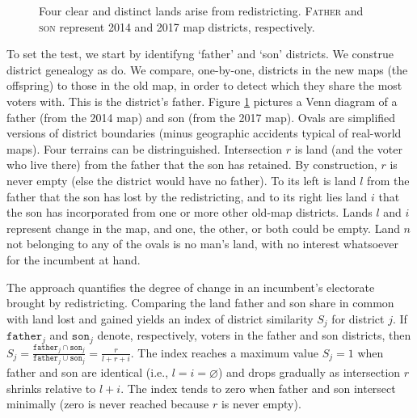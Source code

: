 \documentclass[letter,12pt]{article}
\begin{document}
\begin{figure}
  \centering
    \usetikzlibrary{calc}
    \caption{Four clear and distinct lands arise from redistricting. \textsc{Father} and \textsc{son} represent 2014 and 2017 map districts, respectively.}\label{F:venn}
\end{figure}

To set the test, we start by identifyng `father' and `son' districts. We construe district genealogy as \citet{cox.katz.2002} do. We compare, one-by-one, districts in the new maps (the offspring) to those in the old map, in order to detect which they share the most voters with. This is the district's father. Figure \ref{F:venn} pictures a Venn diagram of a father  (from the 2014 map) and son (from the 2017 map). Ovals are simplified versions of district boundaries (minus geographic accidents typical of real-world maps). Four terrains can be distringuished. Intersection $r$ is land (and the voter who live there) from the father that the son has retained. By construction, $r$ is never empty (else the district would have no father). To its left is land $l$ from the father that the son has lost by the redistricting, and to its right lies land $i$ that the son has incorporated from one or more other old-map districts. Lands $l$ and $i$ represent change in the map, and one, the other, or both could be empty. Land $n$ not belonging to any of the ovals is no man's land, with no interest whatsoever for the incumbent at hand. 

The approach quantifies the degree of change in an incumbent's electorate brought by redistricting. Comparing the land father and son share in common with land lost and gained yields an index of district similarity $S_j$ for district $j$. If $\texttt{father}_j$ and $\texttt{son}_j$ denote, respectively, voters in the father and son districts, then $S_j = \frac{\texttt{father}_j \cap \texttt{son}_j}{\texttt{father}_j \cup \texttt{son}_j} = \frac{r}{l+r+i}$. The index reaches a maximum value $S_j=1$ when father and son are identical (i.e., $l=i=\varnothing$) and drops gradually as intersection $r$ shrinks relative to $l+i$. The index tends to zero when father and son intersect minimally (zero is never reached because $r$ is never empty).
\end{document}
